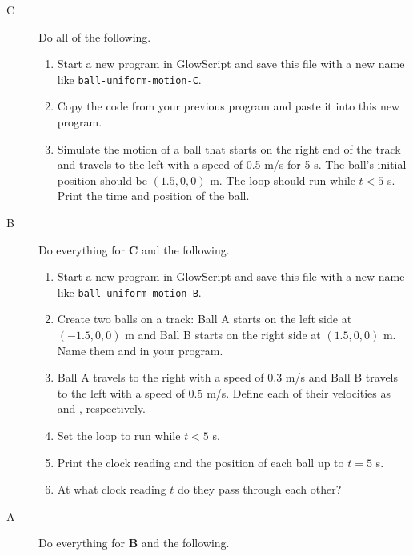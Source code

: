 \begin{description}

\item[C] Do all of the following.
\begin{enumerate}
	\item Start a new program in GlowScript and save this file with a new name like \texttt{ball-uniform-motion-C}.
	\item Copy the code from your previous program and paste it into this new program.
	\item Simulate the motion of a ball that starts on the right end of the track and travels to the left with a speed of 0.5 m/s for 5 s. The ball's initial position should be $(1.5,0,0)$ m. The  loop should run while $t<5$ s. Print the time and position of the ball.
\end{enumerate}

\item[B] Do everything for {\bf C} and the following.

\begin{enumerate}
	\item Start a new program in GlowScript and save this file with a new name like \texttt{ball-uniform-motion-B}.
	\item Create two balls on a track:  Ball A starts on the left side at $(-1.5,0,0)$ m and Ball B starts on the right side at  $(1.5,0,0)$ m. Name them  and  in your program.
	\item Ball A travels to the right with a speed of 0.3 m/s and Ball B travels to the left with a speed of 0.5 m/s. Define each of their velocities as  and , respectively.
	\item Set the  loop to run while $t<5$ s. 
	\item Print the clock reading  and the position of each ball up to $t=5$ s.
	\item At what clock reading $t$ do they pass through each other?
\end{enumerate}

\item[A] Do everything for {\bf B} and the following.


\end{description}
